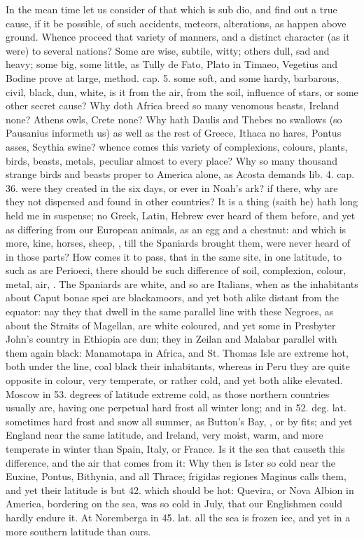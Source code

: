 {In the mean time let us consider of that which is sub dio, and find out
a true cause, if it be possible, of such accidents, meteors,
alterations, as happen above ground. Whence proceed that variety of
manners, and a distinct character (as it were) to several nations? Some
are wise, subtile, witty; others dull, sad and heavy; some big, some
little, as Tully de Fato, Plato in Timaeo, Vegetius and Bodine prove at
large, method. cap. 5. some soft, and some hardy, barbarous, civil,
black, dun, white, is it from the air, from the soil, influence of
stars, or some other secret cause? Why doth Africa breed so many
venomous beasts, Ireland none? Athens owls, Crete none? Why hath
Daulis and Thebes no swallows (so Pausanius informeth us) as well as
the rest of Greece, Ithaca no hares, Pontus asses, Scythia swine?
whence comes this variety of complexions, colours, plants, birds,
beasts, metals, peculiar almost to every place? Why so many
thousand strange birds and beasts proper to America alone, as Acosta
demands lib. 4. cap. 36. were they created in the six days, or ever in
Noah's ark? if there, why are they not dispersed and found in other
countries? It is a thing (saith he) hath long held me in suspense; no
Greek, Latin, Hebrew ever heard of them before, and yet as differing
from our European animals, as an egg and a chestnut: and which is more,
kine, horses, sheep, \etc{}, till the Spaniards brought them, were never
heard of in those parts? How comes it to pass, that in the same site,
in one latitude, to such as are Perioeci, there should be such
difference of soil, complexion, colour, metal, air, \etc{}. The Spaniards
are white, and so are Italians, when as the inhabitants about
Caput bonae spei are blackamoors, and yet both alike distant from
the equator: nay they that dwell in the same parallel line with these
Negroes, as about the Straits of Magellan, are white coloured, and yet
some in Presbyter John's country in Ethiopia are dun; they in Zeilan
and Malabar parallel with them again black: Manamotapa in Africa, and
St. Thomas Isle are extreme hot, both under the line, coal black their
inhabitants, whereas in Peru they are quite opposite in colour, very
temperate, or rather cold, and yet both alike elevated. Moscow in 53.
degrees of latitude extreme cold, as those northern countries usually
are, having one perpetual hard frost all winter long; and in 52. deg.
lat. sometimes hard frost and snow all summer, as Button's Bay, \etc{}, or
by fits; and yet England near the same latitude, and Ireland,
very moist, warm, and more temperate in winter than Spain, Italy, or
France. Is it the sea that causeth this difference, and the air that
comes from it: Why then is Ister so cold near the Euxine, Pontus,
Bithynia, and all Thrace; frigidas regiones Maginus calls them, and yet
their latitude is but 42. which should be hot:  Quevira, or Nova
Albion in America, bordering on the sea, was so cold in July, that our
Englishmen could hardly endure it. At Noremberga in 45. lat. all
the sea is frozen ice, and yet in a more southern latitude than ours.

}
